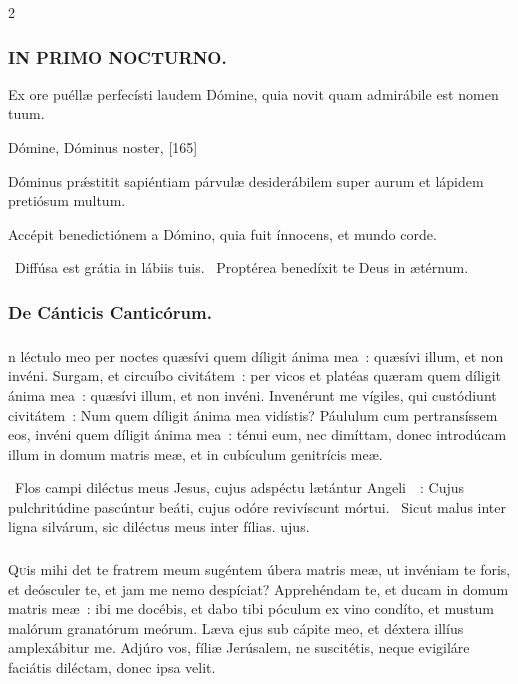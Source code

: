 \documentclass[9pt,twoside]{extarticle}
\begin{document}
\begin{multicols}{2}
{{\subsubsection*{\center \textsc{IN PRIMO NOCTURNO.}}
\begin{tightlist}{}
\item {} Ex ore puéllæ perfecísti laudem Dómine, quia novit quam admirábile est nomen tuum.
\item {} Dómine, Dóminus noster,  [165]
\item {} Dóminus prǽstitit sapiéntiam párvulæ desiderábilem super aurum et lápidem pretiósum multum.
\item {} Accépit benedictiónem a Dómino, quia fuit ínnocens, et mundo corde.
\item {}~Diffúsa est grátia in lábiis tuis. ~Proptérea benedíxit te Deus in ætérnum.
\item {}
\end{tightlist}

\subsubsection*{\center De Cánticis Canticórum.}
\subsubsection*{\center {}}
n léctulo meo per noctes quæsívi quem díligit ánima mea~: quæsívi illum, et non invéni. Surgam, et circuíbo civitátem~: per vicos et platéas quæram quem díligit ánima mea~: quæsívi illum, et non invéni. Invenérunt me vígiles, qui custódiunt civitátem~: Num quem díligit ánima mea vidístis? Páululum cum pertransíssem eos, invéni quem díligit ánima mea~: ténui eum, nec dimíttam, donec introdúcam illum in domum matris meæ, et in cubículum genitrícis meæ.

\begin{tightlist}{}
\item {}~Flos campi diléctus meus Jesus, cujus adspéctu lætántur Angeli~~: \textred{*} Cujus pulchritúdine pascúntur beáti, cujus odóre revivíscunt mórtui. ~Sicut malus inter ligna silvárum, sic diléctus meus inter fílias. ujus.
\end{tightlist}

\subsubsection*{\center {}}
\lettrine{Q}uis mihi det te fratrem meum sugéntem úbera matris meæ, ut invéniam te foris, et deósculer te, et jam me nemo despíciat? Apprehéndam te, et ducam in domum matris meæ~: ibi me docébis, et dabo tibi póculum ex vino condíto, et mustum malórum granatórum meórum. Læva ejus sub cápite meo, et déxtera illíus amplexábitur me. Adjúro vos, fíliæ Jerúsalem, ne suscitétis, neque evigiláre faciátis diléctam, donec ipsa velit.

}}
\end{multicols}
\end{document}
